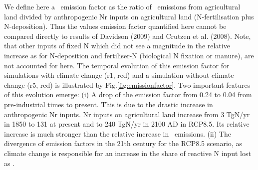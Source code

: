 \documentclass{myreport}
\begin{document}
We define here a \nno\ emission factor as the ratio of \nno\ emissions from agricultural land divided by anthropogenic Nr inputs on agricultural land (N-fertilisation plus N-deposition). Thus the values emission factor quantified here cannot be compared directly to results of Davidson (2009)\cite{davidson09natgeo} and Crutzen et al. (2008)\cite{crutzen08atmchemphys}. Note, that other inputs of fixed N which did not see a magnitude in the relative increase as for N-deposition and fertiliser-N (biological N fixation or manure), are not accounted for here. The temporal evolution of this emission factor for simulations with climate change (r1, red) and a simulation without climate change (r5, red) is illustrated by Fig.\ref{fig:emissionfactor}. Two important features of this evolution emerge: (i) A drop of the emission factor from 0.24 to 0.04 from pre-industrial times to present. This is due to the drastic increase in anthropogenic Nr inputs. Nr inputs on agricultural land increase from 3 TgN/yr in 1850 to 131 at present and to 240 TgN/yr in 2100 AD in RCP8.5. Its relative increase is much stronger than the relative increase in \nno\ emissions. (ii) The divergence of emission factors in the 21th century for the RCP8.5 scenario, as climate change is responsible for an increase in the share of reactive N input lost as \nno .



\end{document}
